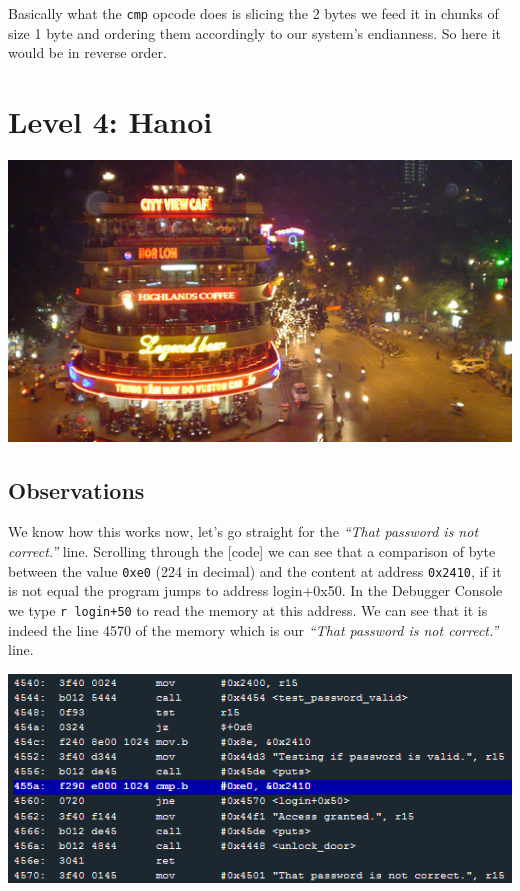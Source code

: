 Basically what the \texttt{cmp} opcode does is slicing the 2 bytes we
feed it in chunks of size 1 byte and ordering them accordingly to our
system's endianness. So here it would be in reverse order.

\section{Level 4: Hanoi}\label{level-4-hanoi}

\includegraphics{img/4_1.PNG}

\subsection{Observations}\label{observations-1}

We know how this works now, let's go straight for the \emph{``That
password is not correct.''} line. Scrolling through the {[}code{]} we
can see that a comparison of byte between the value \texttt{0xe0} (224
in decimal) and the content at address \texttt{0x2410}, if it is not
equal the program jumps to address login+0x50. In the Debugger Console
we type \texttt{r login+50} to read the memory at this address. We can
see that it is indeed the line 4570 of the memory which is our
\emph{``That password is not correct.''} line.

\includegraphics{img/3_1.PNG}

